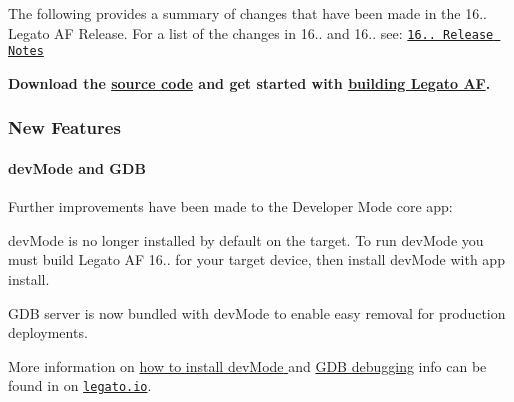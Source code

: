 The following provides a summary of changes that have been made in the 16.. Legato AF Release. For a list of the changes in 16.. and 16.. see\+: \href{http://legato.io/legato-docs/16_10/Legato_16_10_1_ReleaseNotes.pdf}{\tt 16.. Release Notes}

{\bfseries  Download the \hyperlink{aboutReleaseInfo}{source code} and get started with \hyperlink{basicBuild}{building Legato AF}. }\hypertarget{releaseNotes16103_rn16_10_3_Features}{}\subsubsection{New Features}\label{releaseNotes16103_rn16_10_3_Features}
\hypertarget{releaseNotes16103_rn16_10_3_devModeGDB}{}\paragraph{dev\+Mode and G\+DB}\label{releaseNotes16103_rn16_10_3_devModeGDB}
Further improvements have been made to the Developer Mode core app\+:
\begin{DoxyItemize}
\item {\ttfamily dev\+Mode} is no longer installed by default on the target. To run {\ttfamily dev\+Mode} you must build Legato AF 16.. for your target device, then install {\ttfamily dev\+Mode} with {\ttfamily app} {\ttfamily install}.
\item G\+DB server is now bundled with {\ttfamily dev\+Mode} to enable easy removal for production deployments.
\end{DoxyItemize}

More information on \hyperlink{basicTargetDevMode}{how to install {\ttfamily dev\+Mode} }and \hyperlink{howToDebugGDB}{G\+DB debugging} info can be found in on \href{http://legato.io}{\tt legato.\+io}.

